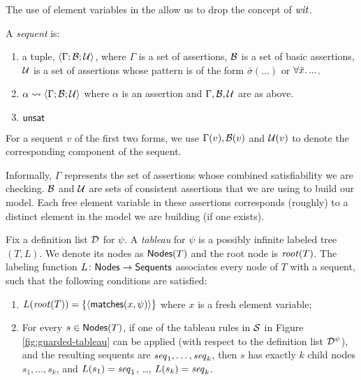 The use of element variables in the \prule{\dapp} allow us to drop the
concept of \(\mathit{wit}\).

\begin{definition}[Sequent]A \emph{sequent} is:

\begin{enumerate}
\def\labelenumi{\arabic{enumi}.}
\tightlist
\item
  a tuple, \(\left\langle \Gamma; \mathcal{B}; \mathcal{U} \right\rangle\),
  where \(\Gamma\) is a set of assertions,
  \(\mathcal{B}\) is a set of basic assertions,
  \(\mathcal{U}\) is a set of assertions whose pattern is of the form \(\bar\sigma(...)\) or \(\forall \bar x\ldotp ...\).
\item
  \(\alpha \leadsto \left\langle \Gamma; \mathcal{B}; \mathcal{U} \right\rangle\) where \(\alpha\) is an assertion
  and \(\Gamma, \mathcal{B}, \mathcal{U}\) are as above.
\item
  \(\mathsf{unsat}\)
\end{enumerate}

For a sequent \(v\) of the first two forms, we use \(\Gamma(v), \mathcal{B}(v)\) and \(\mathcal{U}(v)\)
to denote the corresponding component of the sequent.\end{definition}

Informally,
\(\Gamma\) represents the set of assertions whose combined satisfiability we are checking.
\(\mathcal{B}\) and \(\mathcal{U}\) are sets of consistent assertions that we are using to build our model.
Each free element variable in these assertions corresponds (roughly) to a distinct element in the
model we are building (if one exists).

\begin{definition}[Tableaux]\label{def:tableau}
Fix a definition list \(\mathcal D\) for \(\psi\).
A \emph{tableau} for \(\psi\) is a possibly infinite labeled tree \((T,L)\).
We denote its nodes as \(\mathsf{Nodes}(T)\) and the root node is \(\mathit{root}(T)\).
The labeling function \(L \colon \mathsf{Nodes} \to \mathsf{Sequents}\)
associates every node of \(T\) with a sequent, such that the following conditions
are satisfied:

\begin{enumerate}
\def\labelenumi{\arabic{enumi}.}
\tightlist
\item
  \(L(\mathit{root}(T)) = \{ \left\langle \mathsf{matches}(x,\allowbreak \psi) \right\rangle \}\) where \(x\) is a fresh element variable;
\item
  For every \(s \in \mathsf{Nodes}(T)\), if one of the tableau rules in \(\mathcal{S}\) in Figure \ref{fig:guarded-tableau} can be applied (with respect to the
  definition list \(\mathcal D^\psi\)), and the resulting sequents are
  \(\mathit{seq}_1,\dots,\mathit{seq}_k\), then
  \(s\) has exactly \(k\) child nodes \(s_1,\dots,s_k\), and
  \(L(s_1) = \mathit{seq}_1\), \dots, \(L(s_k) = \mathit{seq}_k\).
\end{enumerate}

\end{definition}

